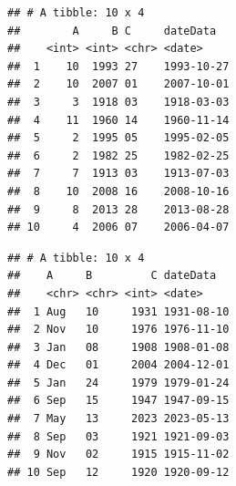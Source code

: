 \documentclass[
]{article}
\newenvironment{Shaded}{\begin{snugshade}}{\end{snugshade}}
\newcommand{\AttributeTok}[1]{\textcolor[rgb]{0.13,0.29,0.53}{#1}}
\newcommand{\FunctionTok}[1]{\textcolor[rgb]{0.13,0.29,0.53}{\textbf{#1}}}
\newcommand{\NormalTok}[1]{#1}
\newcommand{\OtherTok}[1]{\textcolor[rgb]{0.56,0.35,0.01}{#1}}
\newcommand{\SpecialCharTok}[1]{\textcolor[rgb]{0.81,0.36,0.00}{\textbf{#1}}}
\begin{document}
\begin{Shaded}
\end{Shaded}

\begin{verbatim}
## # A tibble: 10 x 4
##        A     B C     dateData  
##    <int> <int> <chr> <date>    
##  1    10  1993 27    1993-10-27
##  2    10  2007 01    2007-10-01
##  3     3  1918 03    1918-03-03
##  4    11  1960 14    1960-11-14
##  5     2  1995 05    1995-02-05
##  6     2  1982 25    1982-02-25
##  7     7  1913 03    1913-07-03
##  8    10  2008 16    2008-10-16
##  9     8  2013 28    2013-08-28
## 10     4  2006 07    2006-04-07
\end{verbatim}

\begin{Shaded}
\end{Shaded}

\begin{verbatim}
## # A tibble: 10 x 4
##    A     B         C dateData  
##    <chr> <chr> <int> <date>    
##  1 Aug   10     1931 1931-08-10
##  2 Nov   10     1976 1976-11-10
##  3 Jan   08     1908 1908-01-08
##  4 Dec   01     2004 2004-12-01
##  5 Jan   24     1979 1979-01-24
##  6 Sep   15     1947 1947-09-15
##  7 May   13     2023 2023-05-13
##  8 Sep   03     1921 1921-09-03
##  9 Nov   02     1915 1915-11-02
## 10 Sep   12     1920 1920-09-12
\end{verbatim}
\end{document}
